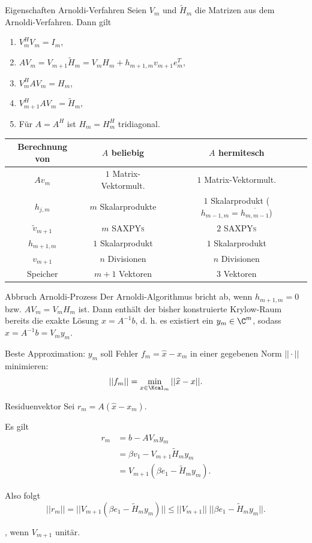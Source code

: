 \begin{karte}{Eigenschaften Arnoldi-Verfahren}
    Seien \(V_m\) und \( \tilde{H}_m \) die Matrizen aus dem Arnoldi-Verfahren. 
    Dann gilt 
    \begin{enumerate}
        \item \( V_m^H V_m = I_m \),
        \item \( A V_m = V_{m+1} \tilde{H}_m = V_m H_m + h_{m+1,m} v_{m+1} e_m^T \),
        \item \( V_m^H A V_m = H_m \),
        \item \( V_{m+1}^H A V_m = \tilde{H}_m \),
        \item Für \( A = A^H \) ist \( H_m = H_m^H \) tridiagonal.
    \end{enumerate}
    \begin{tabular}{|c|c|c|}
        \hline
        Berechnung von & \(A\) beliebig & \(A\) hermitesch \\
        \hline
        \(A v_m\) & \(1\) Matrix-Vektormult. & \(1\) Matrix-Vektormult. \\
        \( h_{j,m} \) & \(m\) Skalarprodukte & \(1\) Skalarprodukt (\(h_{m-1,m} = \overline{h_{m,m-1}}\)) \\
        \( \tilde{v}_{m+1} \) & \(m\) \textsc{SAXPYs} & \(2\) \textsc{SAXPYs} \\
        \( h_{m+1,m} \) & \(1\) Skalarprodukt & \(1\) Skalarprodukt \\
        \( v_{m+1} \) & \(n\) Divisionen & \(n\) Divisionen \\\hline
        Speicher & \(m+1\) Vektoren & \(3\) Vektoren\\
        \hline
    \end{tabular}
\end{karte}

\begin{karte}{Abbruch Arnoldi-Prozess}
    Der Arnoldi-Algorithmus bricht ab, wenn \( h_{m+1,m} = 0 \) 
    bzw. \( A V_m = V_m H_m \) ist. Dann enthält der bisher konstruierte 
    Krylow-Raum bereits die exakte Lösung \( \widehat{x} = A^{-1}b \), d. h. 
    es existiert ein \( y_m \in \C^m \), sodass \( \widehat{x} = A^{-1}b = V_m y_m \).

    Beste Approximation: \(y_m\) soll Fehler \( f_m = \widehat{x} - x_m \)
    in einer gegebenen Norm \(||\cdot||\) minimieren: 
    \[ ||f_m|| = \min_{x\in \Kcal_m} ||\widehat{x} - x||. \]
\end{karte}

\begin{karte}{Residuenvektor}
    Sei \( r_m = A(\widehat{x} - x_m) \). 

    Es gilt \begin{align*}
        r_m &= b - A V_m y_m \\ 
        &= \beta v_1 - V_{m+1} \tilde{H}_m y_m \\
        &= V_{m+1} (\beta e_1 - \tilde{H}_m y_m).
    \end{align*}

    Also folgt 
    \[ ||r_m|| = ||V_{m+1}(\beta e_1 - \tilde{H}_m y_m)|| \leq ||V_{m+1}|| \;||\beta e_1 - \tilde{H}_m y_m||. \]

    \gqq{\(=\)}, wenn \(V_{m+1}\) unitär.
\end{karte}

